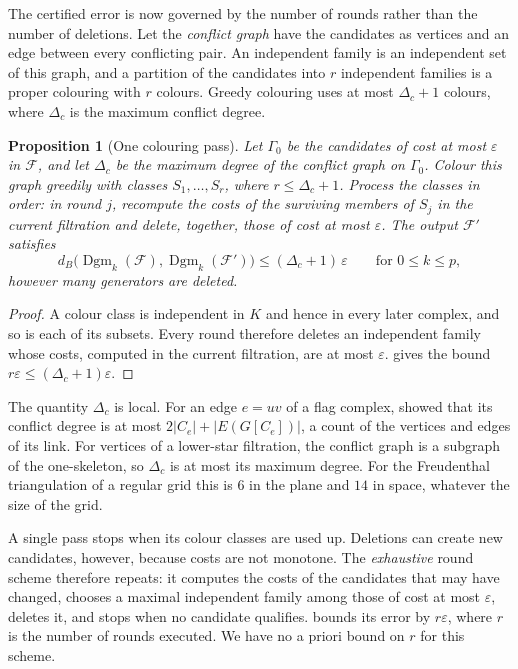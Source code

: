 \documentclass[11pt,letterpaper]{article}
\newtheorem{proposition}[theorem]{Proposition}
\theoremstyle{definition}
\newcommand{\Dgm}{\operatorname{Dgm}}
\newcommand{\eps}{\varepsilon}
\begin{document}
The certified error is now governed by the number of rounds rather than the
number of deletions. Let the \emph{conflict graph} have the candidates as
vertices and an edge between every conflicting pair. An independent family is
an independent set of this graph, and a partition of the candidates into $r$
independent families is a proper colouring with $r$ colours. Greedy colouring
uses at most $\Delta_c+1$ colours, where $\Delta_c$ is the maximum conflict
degree.

\begin{proposition}[One colouring pass]
\label{prop:colouring-pass}
Let $\Gamma_0$ be the candidates of cost at most $\eps$ in $\mathcal F$, and
let $\Delta_c$ be the maximum degree of the conflict graph on $\Gamma_0$.
Colour this graph greedily with classes $S_1,\ldots,S_r$, where
$r\leq\Delta_c+1$. Process the classes in order: in round $j$, recompute the
costs of the surviving members of $S_j$ in the current filtration and delete,
together, those of cost at most $\eps$. The output $\mathcal F'$ satisfies
$$
d_B\bigl(\Dgm_k(\mathcal F),\Dgm_k(\mathcal F')\bigr)
\leq(\Delta_c+1)\,\eps
\qquad\text{for }0\leq k\leq p,
$$
however many generators are deleted.
\end{proposition}

\begin{proof}
A colour class is independent in $K$ and hence in every later complex, and so
is each of its subsets. Every round therefore deletes an independent family
whose costs, computed in the current filtration, are at most $\eps$.
 gives the bound $r\eps\leq(\Delta_c+1)\eps$.
\end{proof}

The quantity $\Delta_c$ is local. For an edge $e=uv$ of a flag complex,
 showed that its conflict degree is at most
$2|C_e|+|E(G[C_e])|$, a count of the vertices and edges of its link. For
vertices of a lower-star filtration, the conflict graph is a subgraph of the
one-skeleton, so $\Delta_c$ is at most its maximum degree. For the
Freudenthal triangulation of a regular grid this is $6$ in the plane and $14$
in space, whatever the size of the grid.

A single pass stops when its colour classes are used up. Deletions can create
new candidates, however, because costs are not monotone. The
\emph{exhaustive} round scheme therefore repeats: it computes the costs of the
candidates that may have changed, chooses a maximal independent family among
those of cost at most $\eps$, deletes it, and stops when no candidate
qualifies.  bounds its error by $r\eps$, where $r$ is the
number of rounds executed. We have no a priori bound on $r$ for this scheme.
\end{document}
